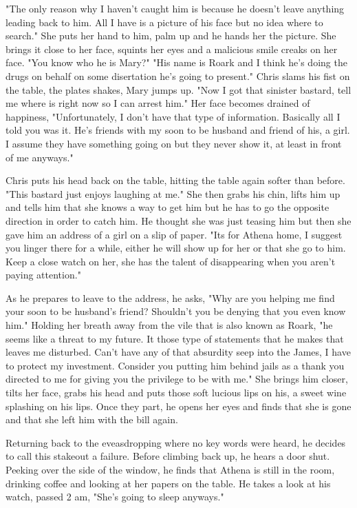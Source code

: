         "The only reason why I haven't caught him is because he doesn't leave anything leading back to him. All I have is a picture of his face
    but no idea where to search." She puts her hand to him, palm up and he hands her the picture. She brings it close to her face, squints her
    eyes and a malicious smile creaks on her face. "You know who he is Mary?" "His name is Roark and I think he's doing the drugs on behalf
    on some disertation he's going to present." Chris slams his fist on the table, the plates shakes, Mary jumps up. "Now I got that sinister
    bastard, tell me where is right now so I can arrest him." Her face becomes drained of happiness, "Unfortunately, I don't have that type of
    information. Basically all I told you was it. He's friends with my soon to be husband and friend of his, a girl. I assume they have something
    going on but they never show it, at least in front of me anyways."

        Chris puts his head back on the table, hitting the table again softer than before. "This bastard just enjoys laughing at me." She then
    grabs his chin, lifts him up and tells him that she knows a way to get him but he has to go the opposite direction in order to catch him.
    He thought she was just teasing him but then she gave him an address of a girl on a slip of paper. "Its for Athena home, I suggest you linger
    there for a while, either he will show up for her or that she go to him. Keep a close watch on her, she has the talent of disappearing when
    you aren't paying attention."

        As he prepares to leave to the address, he asks, "Why are you helping me find your soon to be husband's friend? Shouldn't you be denying
    that you even know him." Holding her breath away from the vile that is also known as Roark, "he seems like a threat to my future. It those
    type of statements that he makes that leaves me disturbed. Can't have any of that absurdity seep into the James, I have to protect my 
    investment. Consider you putting him behind jails as a thank you directed to me for giving you the privilege to be with me." She brings him
    closer, tilts her face, grabs his head and puts those soft lucious lips on his, a sweet wine splashing on his lips. Once they part, he opens
    her eyes and finds that she is gone and that she left him with the bill again.

        Returning back to the eveasdropping where no key words were heard, he decides to call this stakeout a failure. Before climbing back up,
    he hears a door shut. Peeking over the side of the window, he finds that Athena is still in the room, drinking coffee and looking at her
    papers on the table. He takes a look at his watch, passed 2 am, "She's going to sleep anyways."


